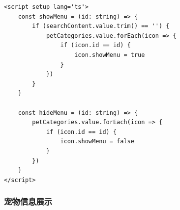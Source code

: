 \begin{itemize}
	\begin{verbatim}
<script setup lang='ts'>
	const showMenu = (id: string) => {
		if (searchContent.value.trim() == '') {
			petCategories.value.forEach(icon => {
				if (icon.id == id) {
					icon.showMenu = true
				}
			})
		}
	}
	
	const hideMenu = (id: string) => {
		petCategories.value.forEach(icon => {
			if (icon.id == id) {
				icon.showMenu = false
			}
		})
	}
</script>
	\end{verbatim}
\end{itemize}

\subsubsection{宠物信息展示}

